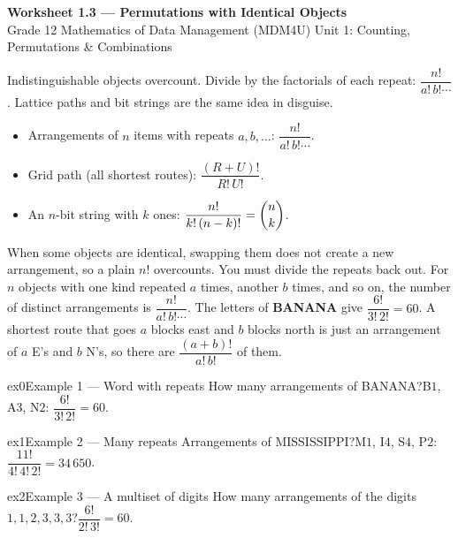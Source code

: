 \documentclass[11pt]{article}
\begin{document}
\begin{center}
{\LARGE\bfseries\color{titleblue}Worksheet 1.3 --- Permutations with Identical Objects}\\[2pt]
{\small Grade 12 Mathematics of Data Management (MDM4U) \textperiodcentered{} Unit 1: Counting, Permutations \& Combinations}
\end{center}

\begin{ideabox}
Indistinguishable objects overcount. Divide by the factorials of each repeat: $\dfrac{n!}{a!\,b!\cdots}$. Lattice paths and bit strings are the same idea in disguise.
\begin{itemize}[leftmargin=*,itemsep=2pt]
  \item Arrangements of $n$ items with repeats $a,b,\dots$: $\dfrac{n!}{a!\,b!\cdots}$.
  \item Grid path (all shortest routes): $\dfrac{(R+U)!}{R!\,U!}$.
  \item An $n$-bit string with $k$ ones: $\dfrac{n!}{k!\,(n-k)!}=\dbinom{n}{k}$.
\end{itemize}
\end{ideabox}

\begin{learnbox}
When some objects are identical, swapping them does not create a new arrangement, so a plain $n!$ overcounts. You must divide the repeats back out.
For $n$ objects with one kind repeated $a$ times, another $b$ times, and so on, the number of distinct arrangements is $\dfrac{n!}{a!\,b!\cdots}$. The letters of \textbf{BANANA} give $\dfrac{6!}{3!\,2!}=60$.
A shortest route that goes $a$ blocks east and $b$ blocks north is just an arrangement of $a$ E's and $b$ N's, so there are $\dfrac{(a+b)!}{a!\,b!}$ of them.
\end{learnbox}


\begin{example}{ex0}{Example 1 --- Word with repeats}
How many arrangements of BANANA?\soln B$1$, A$3$, N$2$: $\dfrac{6!}{3!\,2!}=60$.
\end{example}

\begin{example}{ex1}{Example 2 --- Many repeats}
Arrangements of MISSISSIPPI?\soln M$1$, I$4$, S$4$, P$2$: $\dfrac{11!}{4!\,4!\,2!}=34\,650$.
\end{example}

\begin{example}{ex2}{Example 3 --- A multiset of digits}
How many arrangements of the digits $1,1,2,3,3,3$?\soln $\dfrac{6!}{2!\,3!}=60$.
\end{example}
\end{document}
